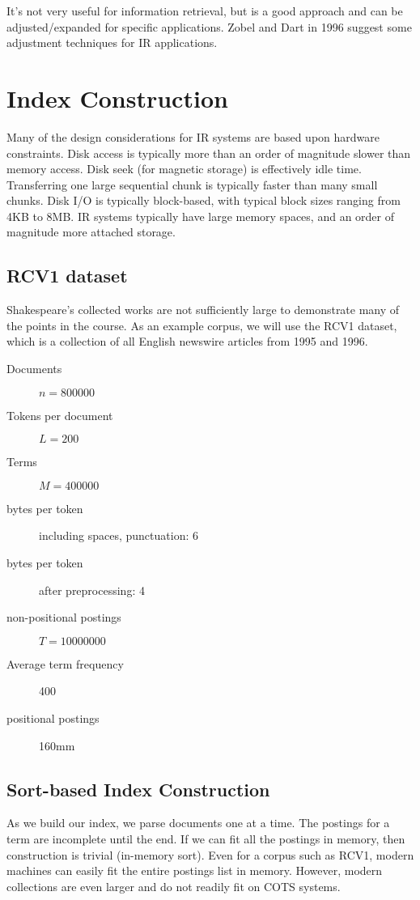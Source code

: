 \documentclass{idc_msc}
\begin{document}
It's not very useful for information retrieval, but is a good approach and can be adjusted/expanded for specific applications.
Zobel and Dart in 1996 suggest some adjustment techniques for IR applications.

\section{Index Construction}

Many of the design considerations for IR systems are based upon hardware constraints.
Disk access is typically more than an order of magnitude slower than memory access.
Disk seek (for magnetic storage) is effectively idle time.
Transferring one large sequential chunk is typically faster than many small chunks.
Disk I/O is typically block-based, with typical block sizes ranging from 4KB to 8MB.
IR systems typically have large memory spaces, and an order of magnitude more attached storage.

\subsection{RCV1 dataset}

Shakespeare's collected works are not sufficiently large to demonstrate many of the points in the course.
As an example corpus, we will use the RCV1 dataset, which is a collection of all English newswire articles from 1995 and 1996.

\begin{description}
  \item[Documents] \(n = 800000\)
  \item[Tokens per document] \(L = 200\)
  \item[Terms] \(M = 400000\)
  \item[bytes per token] including spaces, punctuation: 6
  \item[bytes per token] after preprocessing: 4
  \item[non-positional postings] \(T = 10000000\)
  \item[Average term frequency] 400
  \item[positional postings] 160mm
\end{description}

\subsection{Sort-based Index Construction}

As we build our index, we parse documents one at a time.
The postings for a term are incomplete until the end.
If we can fit all the postings in memory, then construction is trivial (in-memory sort).
Even for a corpus such as RCV1, modern machines can easily fit the entire postings list in memory.
However, modern collections are even larger and do not readily fit on COTS systems.
\end{document}
